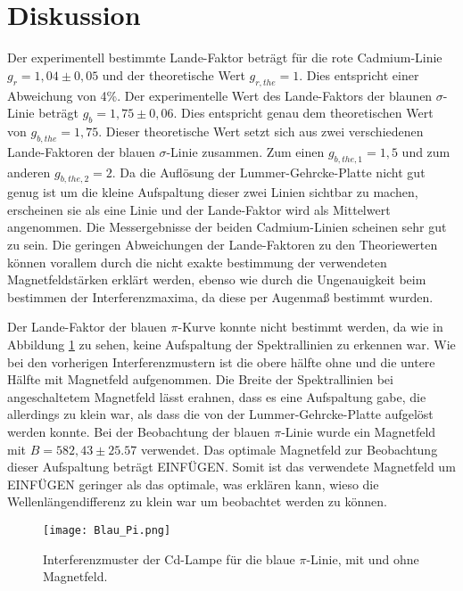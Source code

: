 \section{Diskussion}
\label{sec:Diskussion}
Der experimentell bestimmte Lande-Faktor beträgt für die rote Cadmium-Linie $g_r = 1,04 \pm 0,05$ und der 
theoretische Wert $g_{r,the} = 1$. Dies entspricht einer Abweichung von 4\%.
Der experimentelle Wert des Lande-Faktors der blaunen $\sigma$-Linie beträgt $g_b = 1,75 \pm 0,06$. Dies entspricht genau dem 
theoretischen Wert von $g_{b,the} = 1,75$. Dieser theoretische Wert setzt sich aus zwei verschiedenen Lande-Faktoren der 
blauen $\sigma$-Linie zusammen. Zum einen $g_{b,the,1} = 1,5$ und zum anderen $g_{b,the,2} =2$. Da die Auflösung der Lummer-Gehrcke-Platte 
nicht gut genug ist um die kleine Aufspaltung dieser zwei Linien sichtbar zu machen, erscheinen sie als eine Linie und der 
Lande-Faktor wird als Mittelwert angenommen.
Die Messergebnisse der beiden Cadmium-Linien scheinen sehr gut zu sein. Die geringen Abweichungen der Lande-Faktoren zu den 
Theoriewerten können vorallem durch die nicht exakte bestimmung der verwendeten Magnetfeldstärken erklärt werden, ebenso wie 
durch die Ungenauigkeit beim bestimmen der Interferenzmaxima, da diese per Augenmaß bestimmt wurden.

Der Lande-Faktor der blauen $\pi$-Kurve konnte nicht bestimmt werden, da wie in Abbildung \ref{fig:blau2} zu sehen, keine Aufspaltung 
der Spektrallinien zu erkennen war. Wie bei den vorherigen Interferenzmustern ist die obere hälfte ohne und die untere Hälfte 
mit Magnetfeld aufgenommen. Die Breite der Spektrallinien bei angeschaltetem Magnetfeld lässt erahnen, 
dass es eine Aufspaltung gabe, die allerdings zu klein war, als dass die von der Lummer-Gehrcke-Platte aufgelöst werden konnte.
Bei der Beobachtung der blauen $\pi$-Linie wurde ein Magnetfeld mit $B = 582,43 \pm 25.57$ verwendet. Das optimale Magnetfeld 
zur Beobachtung dieser Aufspaltung beträgt EINFÜGEN. Somit ist das verwendete Magnetfeld um EINFÜGEN geringer als das optimale, 
was erklären kann, wieso die Wellenlängendifferenz zu klein war um beobachtet werden zu können.

\begin{figure}[H]
    \centering
    \texttt{[image: Blau\_Pi.png]}
    \vspace{-10pt}
    \caption{Interferenzmuster der Cd-Lampe für die blaue $\pi$-Linie, mit und ohne Magnetfeld.}
    \label{fig:blau2}
  \end{figure}

